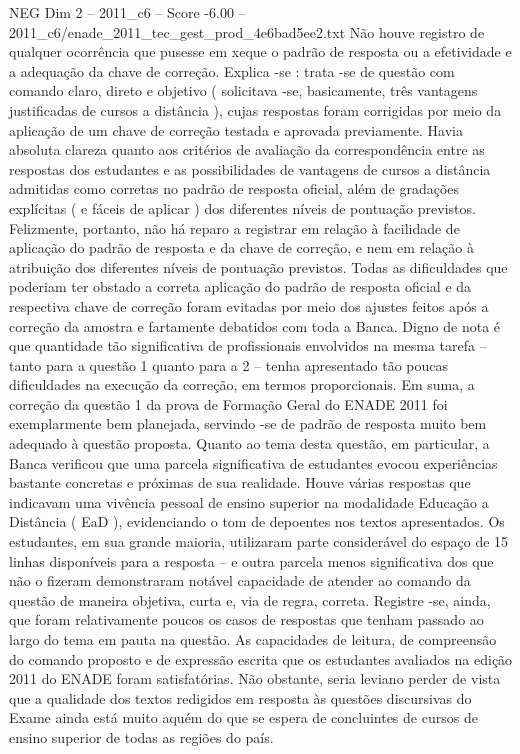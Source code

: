\begin{textsample}{NEG Dim 2 – 2011\_c6 – Score -6.00 – 2011\_c6/enade\_2011\_tec\_gest\_prod\_4e6bad5ee2.txt}
Não houve registro de qualquer ocorrência que pusesse em xeque o padrão de resposta ou a efetividade e a adequação da chave de correção.
Explica -se : trata -se de questão com comando claro, direto e objetivo ( solicitava -se, basicamente, três vantagens justificadas de cursos a distância ), cujas respostas foram corrigidas por meio da aplicação de um chave de correção testada e aprovada previamente.
Havia absoluta clareza quanto aos critérios de avaliação da correspondência entre as respostas dos estudantes e as possibilidades de vantagens de cursos a distância admitidas como corretas no padrão de resposta oficial, além de gradações explícitas ( e fáceis de aplicar ) dos diferentes níveis de pontuação previstos.
Felizmente, portanto, não há reparo a registrar em relação à facilidade de aplicação do padrão de resposta e da chave de correção, e nem em relação à atribuição dos diferentes níveis de pontuação previstos.
Todas as dificuldades que poderiam ter obstado a correta aplicação do padrão de resposta oficial e da respectiva chave de correção foram evitadas por meio dos ajustes feitos após a correção da amostra e fartamente debatidos com toda a Banca.
Digno de nota é que quantidade tão significativa de profissionais envolvidos na mesma tarefa – tanto para a questão 1 quanto para a 2 – tenha apresentado tão poucas dificuldades na execução da correção, em termos proporcionais.
Em suma, a correção da questão 1 da prova de Formação Geral do ENADE 2011 foi exemplarmente bem planejada, servindo -se de padrão de resposta muito bem adequado à questão proposta.
Quanto ao tema desta questão, em particular, a Banca verificou que uma parcela significativa de estudantes evocou experiências bastante concretas e próximas de sua realidade.
Houve várias respostas que indicavam uma vivência pessoal de ensino superior na modalidade Educação a Distância ( EaD ), evidenciando o tom de depoentes nos textos apresentados.
Os estudantes, em sua grande maioria, utilizaram parte considerável do espaço de 15 linhas disponíveis para a resposta – e outra parcela menos significativa dos que não o fizeram demonstraram notável capacidade de atender ao comando da questão de maneira objetiva, curta e, via de regra, correta.
Registre -se, ainda, que foram relativamente poucos os casos de respostas que tenham passado ao largo do tema em pauta na questão.
As capacidades de leitura, de compreensão do comando proposto e de expressão escrita que os estudantes avaliados na edição 2011 do ENADE foram satisfatórias.
Não obstante, seria leviano perder de vista que a qualidade dos textos redigidos em resposta às questões discursivas do Exame ainda está muito aquém do que se espera de concluintes de cursos de ensino superior de todas as regiões do país.

\end{textsample}
